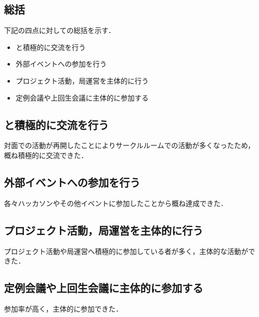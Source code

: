 \subsection*{\secondGrade{}総括}


下記の四点に対しての総括を示す．
\begin{itemize}
    \item \firstGrade{}と積極的に交流を行う
    \item 外部イベントへの参加を行う
    \item プロジェクト活動，局運営を主体的に行う
    \item 定例会議や上回生会議に主体的に参加する
\end{itemize}

\subsection*{\firstGrade{}と積極的に交流を行う}
対面での活動が再開したことによりサークルルームでの活動が多くなったため，
概ね積極的に交流できた．

\subsection*{外部イベントへの参加を行う}
各々ハッカソンやその他イベントに参加したことから概ね達成できた．

\subsection*{プロジェクト活動，局運営を主体的に行う}
プロジェクト活動や局運営へ積極的に参加している者が多く，主体的な活動ができた．

\subsection*{定例会議や上回生会議に主体的に参加する}
参加率が高く，主体的に参加できた．
